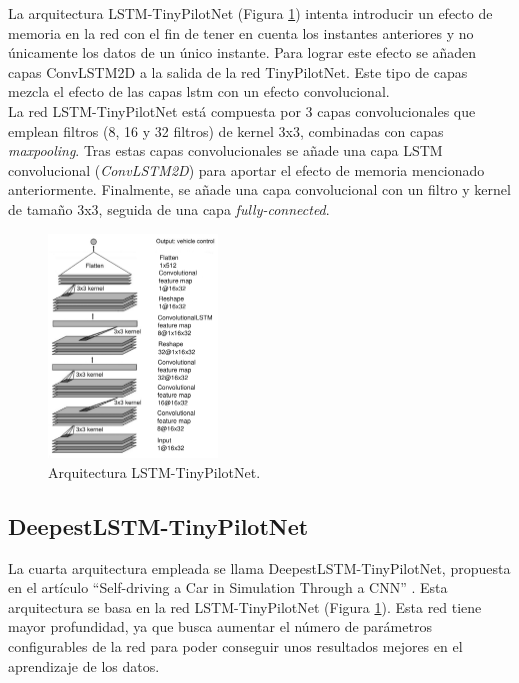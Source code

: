 La arquitectura LSTM-TinyPilotNet (Figura \ref{fig.Lstm_TinyPilotNet}) intenta introducir un efecto de memoria en la red con el fin de tener en cuenta los instantes anteriores y no únicamente los datos de un único instante. Para lograr este efecto se añaden capas ConvLSTM2D a la salida de la red TinyPilotNet. Este tipo de capas mezcla el efecto de las capas \acrshort{lstm} con un efecto convolucional.  \\

La red LSTM-TinyPilotNet está compuesta por 3 capas convolucionales que emplean filtros (8, 16 y 32 filtros) de kernel 3x3, combinadas con capas \textit{maxpooling}. Tras estas capas convolucionales se añade una capa LSTM convolucional (\textit{ConvLSTM2D}) para aportar el efecto de memoria mencionado anteriormente. Finalmente, se añade una capa convolucional con un filtro y kernel de tamaño 3x3, seguida de una capa \textit{fully-connected}.\\

\begin{figure}
\begin{center}
	\includegraphics[width=0.4\textwidth]{figures/Regresion/lstm_tinypilotnet.png}
   \caption{Arquitectura LSTM-TinyPilotNet.}
	\label{fig.Lstm_TinyPilotNet}
\end{center}
\end{figure}


\subsection{DeepestLSTM-TinyPilotNet}\label{deeplstm}

La cuarta arquitectura empleada se llama DeepestLSTM-TinyPilotNet, propuesta en el artículo ``Self-driving a Car in Simulation Through a CNN'' \cite{self-driving}. Esta arquitectura se basa en la red LSTM-TinyPilotNet (Figura \ref{fig.Lstm_TinyPilotNet}). Esta red tiene mayor profundidad, ya que busca aumentar el número de parámetros configurables de la red para poder conseguir unos resultados mejores en el aprendizaje de los datos.\\

